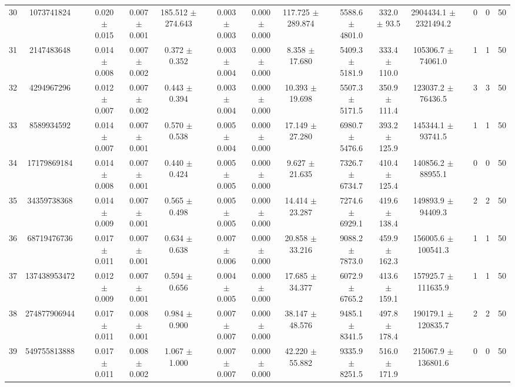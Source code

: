 \documentclass[11pt]{article}
\begin{document}
\begin{landscape}
\begin{table}
\begin{tabular}{cccccccccccccccccc}
30 & 1073741824 &&  0.020 $\pm$ 0.015 & 0.007 $\pm$ 0.001 & 185.512 $\pm$ 274.643 &&  0.003 $\pm$ 0.003 & 0.000 $\pm$ 0.000 & 117.725 $\pm$ 289.874 &&  5588.6 $\pm$ 4801.0 & 332.0 $\pm$ 93.5 & 2904434.1 $\pm$ 2321494.2 && 0& 0& 50\\
31 & 2147483648 &&  0.014 $\pm$ 0.008 & 0.007 $\pm$ 0.002 & 0.372 $\pm$ 0.352 &&  0.003 $\pm$ 0.004 & 0.000 $\pm$ 0.000 & 8.358 $\pm$ 17.680 &&  5409.3 $\pm$ 5181.9 & 333.4 $\pm$ 110.0 & 105306.7 $\pm$ 74061.0 && 1& 1& 50\\
32 & 4294967296 &&  0.012 $\pm$ 0.007 & 0.007 $\pm$ 0.002 & 0.443 $\pm$ 0.394 &&  0.003 $\pm$ 0.004 & 0.000 $\pm$ 0.000 & 10.393 $\pm$ 19.698 &&  5507.3 $\pm$ 5171.5 & 350.9 $\pm$ 111.4 & 123037.2 $\pm$ 76436.5 && 3& 3& 50\\
33 & 8589934592 &&  0.014 $\pm$ 0.007 & 0.007 $\pm$ 0.001 & 0.570 $\pm$ 0.538 &&  0.005 $\pm$ 0.004 & 0.000 $\pm$ 0.000 & 17.149 $\pm$ 27.280 &&  6980.7 $\pm$ 5476.6 & 393.2 $\pm$ 125.9 & 145344.1 $\pm$ 93741.5 && 1& 1& 50\\
34 & 17179869184 &&  0.014 $\pm$ 0.008 & 0.007 $\pm$ 0.001 & 0.440 $\pm$ 0.424 &&  0.005 $\pm$ 0.005 & 0.000 $\pm$ 0.000 & 9.627 $\pm$ 21.635 &&  7326.7 $\pm$ 6734.7 & 410.4 $\pm$ 125.4 & 140856.2 $\pm$ 88955.1 && 0& 0& 50\\
35 & 34359738368 &&  0.014 $\pm$ 0.009 & 0.007 $\pm$ 0.001 & 0.565 $\pm$ 0.498 &&  0.005 $\pm$ 0.005 & 0.000 $\pm$ 0.000 & 14.414 $\pm$ 23.287 &&  7274.6 $\pm$ 6929.1 & 419.6 $\pm$ 138.4 & 149893.9 $\pm$ 94409.3 && 2& 2& 50\\
36 & 68719476736 &&  0.017 $\pm$ 0.011 & 0.007 $\pm$ 0.001 & 0.634 $\pm$ 0.638 &&  0.007 $\pm$ 0.006 & 0.000 $\pm$ 0.000 & 20.858 $\pm$ 33.216 &&  9088.2 $\pm$ 7873.0 & 459.9 $\pm$ 162.3 & 156005.6 $\pm$ 100541.3 && 1& 1& 50\\
37 & 137438953472 &&  0.012 $\pm$ 0.009 & 0.007 $\pm$ 0.001 & 0.594 $\pm$ 0.656 &&  0.004 $\pm$ 0.005 & 0.000 $\pm$ 0.000 & 17.685 $\pm$ 34.377 &&  6072.9 $\pm$ 6765.2 & 413.6 $\pm$ 159.1 & 157925.7 $\pm$ 111635.9 && 1& 1& 50\\
38 & 274877906944 &&  0.017 $\pm$ 0.011 & 0.008 $\pm$ 0.001 & 0.984 $\pm$ 0.900 &&  0.007 $\pm$ 0.007 & 0.000 $\pm$ 0.000 & 38.147 $\pm$ 48.576 &&  9485.1 $\pm$ 8341.5 & 497.8 $\pm$ 178.4 & 190179.1 $\pm$ 120835.7 && 2& 2& 50\\
39 & 549755813888 &&  0.017 $\pm$ 0.011 & 0.008 $\pm$ 0.002 & 1.067 $\pm$ 1.000 &&  0.007 $\pm$ 0.007 & 0.000 $\pm$ 0.000 & 42.220 $\pm$ 55.882 &&  9335.9 $\pm$ 8251.5 & 516.0 $\pm$ 171.9 & 215067.9 $\pm$ 136801.6 && 0& 0& 50\\

\end{tabular}
\end{table}
\end{landscape}
\end{document}

